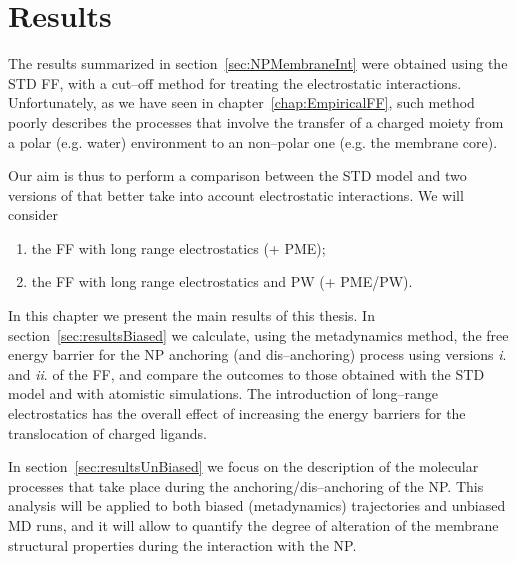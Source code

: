 \chapter{Results}
\label{chap:results}
The results summarized in section~\ref{sec:NPMembraneInt} were obtained using the \ac{STD} \martini \ac{FF}, with a cut--off method for treating the electrostatic interactions. Unfortunately, as we have seen in chapter~\ref{chap:EmpiricalFF}, such method poorly describes the processes that involve the transfer of a charged moiety from a polar (e.g. water) environment to an non--polar one (e.g. the membrane core).

Our aim is thus to perform a comparison between the \ac{STD} \martini model and two versions of \martini that better take into account electrostatic interactions. We will consider 
\begin{enumerate}[label=\roman*.]
	\item the \martini \ac{FF} with long range electrostatics (\martini + \ac{PME});
	\item the \martini \ac{FF} with long range electrostatics and \ac{PW} (\martini + \ac{PME}/\acs{PW}).
\end{enumerate}

In this chapter we present the main results of this thesis. In section~\ref{sec:resultsBiased} we calculate, using the metadynamics method, the free energy barrier for the \ac{NP} anchoring (and dis--anchoring) process using versions \textit{i}. and \textit{ii}. of the \martini \ac{FF}, and compare the outcomes to those obtained with the \ac{STD} \martini model and with atomistic simulations. The introduction of long--range electrostatics has the overall effect of increasing the energy barriers for the translocation of charged ligands.

In section~\ref{sec:resultsUnBiased} we focus on the description of the molecular processes that take place during the anchoring/dis--anchoring of the \ac{NP}. This analysis will be applied to both biased (metadynamics) trajectories and unbiased \ac{MD} runs, and it will allow to quantify the degree of alteration of the membrane structural properties during the interaction with the \ac{NP}.

